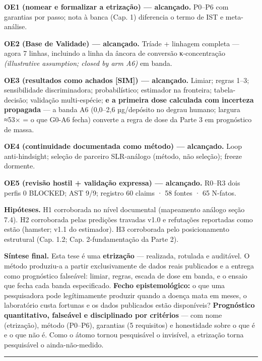 \documentclass[12pt,a4paper,oneside]{report}
\begin{document}
\textbf{OE1 (nomear e formalizar a etrização) --- alcançado.} P0--P6 com
garantias por passo; nota à banca (Cap. 1) diferencia o termo de IST e
meta-análise.

\textbf{OE2 (Base de Validade) --- alcançado.} Tríade + linhagem
completa --- agora 7 linhas, incluindo a linha da âncora de conversão
κ-concentração \emph{(illustrative assumption; closed by arm A6)} em
banda.

\textbf{OE3 (resultados como achados {[}SIM{]}) --- alcançado.} Limiar;
regras 1--3; sensibilidade discriminadora; probabilístico; estimador na
fronteira; tabela-decisão; validação multi-espécie; \textbf{e a primeira
dose calculada com incerteza propagada} --- a banda A6 (0,0--2,6
µg/depósito no degrau humano; largura ≈53× = o que G0-A6 fecha) converte
a regra de dose da Parte 3 em prognóstico de massa.

\textbf{OE4 (continuidade documentada como método) --- alcançado.} Loop
anti-hindsight; seleção de parceiro SLR-análogo (método, não seleção);
freeze dormente.

\textbf{OE5 (revisão hostil + validação expressa) --- alcançado.} R0--R3
dois perfis 0 BLOCKED; AST 9/9; registro 60 claims · 58 fontes · 65
N-fatos.

\textbf{Hipóteses.} H1 corroborada no nível documental (mapeamento
análogo seção 7.4). H2 corroborada pelas predições travadas v1.0 e
refutações reportadas como estão (hamster; v1.1 do estimador). H3
corroborada pelo posicionamento estrutural (Cap. 1.2; Cap.
2-fundamentação da Parte 2).

\textbf{Síntese final.} Esta tese é uma \textbf{etrização} ---
realizada, rotulada e auditável. O método produziu-a a partir
exclusivamente de dados reais publicados e a entrega como prognóstico
falseável: limiar, regras, escada de dose em banda, e o ensaio que fecha
cada banda especificado. \textbf{Fecho epistemológico:} o que uma
pesquisadora pode legítimamente produzir quando a doença mata em meses,
o laboratório custa fortunas e os dados publicados estão disponíveis?
\textbf{Prognóstico quantitativo, falseável e disciplinado por
critérios} --- com nome (etrização), método (P0--P6), garantias (5
requisitos) e honestidade sobre o que é e o que não é. Como o átomo
tornou pesquisável o invisível, a etrização torna pesquisável o
ainda-não-medido.

\begin{center}\rule{0.5\linewidth}{0.5pt}\end{center}
\end{document}
